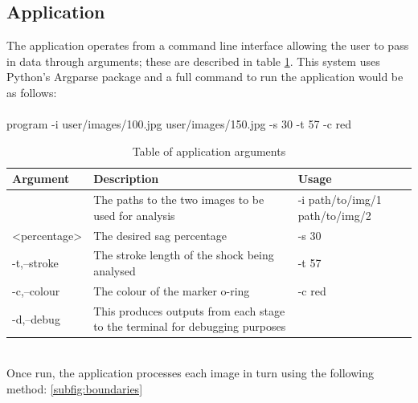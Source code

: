 \subsection{Application}
	The application operates from a command line interface allowing the user to pass in data through arguments; these are described in table \ref{tab:arguments}. This system uses Python's Argparse package and a full command to run the application would be as follows:
	\\\\
	{\centering \ttfamily program -i user/images/100.jpg user/images/150.jpg -s 30 -t 57 -c red}
	\begin{table}[h!]
		\centering
		\caption{Table of application arguments}
		\label{tab:arguments}
		\begin{tabular}{|l|p{}|l|}
		\hline
		\bfseries Argument&\bfseries Description&\bfseries Usage\\
		\hline
		{\ttfamily [-i,--image]<path1 path2>}&The paths to the two images to be used for analysis&{\ttfamily -i path/to/img/1 path/to/img/2}\\
		{\ttfamily [-s,--sag]<percentage>}&The desired sag percentage&{\ttfamily -s 30}\\
		{\ttfamily -t,--stroke}&The stroke length of the shock being analysed&{\ttfamily -t 57}\\
		{\ttfamily -c,--colour}&The colour of the marker o-ring&{\ttfamily -c red}\\
		{\ttfamily -d,--debug}&This produces outputs from each stage to the terminal for debugging purposes&\\
		\hline
		\end{tabular}
	\end{table}\\
	Once run, the application processes each image in turn using the following method: \ref{subfig:boundaries}
